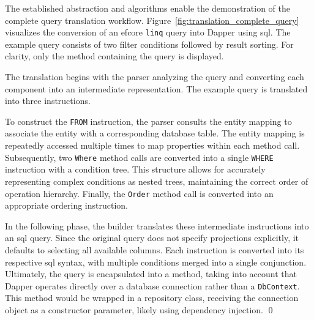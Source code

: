 
\begin{example}
\small
The established abstraction and algorithms enable the demonstration of the complete query translation workflow. Figure~\ref{fig:translation_complete_query} visualizes the conversion of an \acrshort{efcore} \texttt{linq} query into Dapper using \acrshort{sql}. The example query consists of two filter conditions followed by result sorting. For clarity, only the method containing the query is displayed. 

The translation begins with the parser analyzing the query and converting each component into an intermediate representation. The example query is translated into three instructions.

To construct the \texttt{FROM} instruction, the parser consults the entity mapping to associate the entity with a corresponding database table. The entity mapping is repeatedly accessed multiple times to map  properties within each method call. Subsequently, two \texttt{Where} method calls are converted into a single \texttt{WHERE} instruction with a condition tree. This structure allows for accurately representing complex conditions as nested trees, maintaining the correct order of operation hierarchy. Finally, the \texttt{Order} method call is converted into an appropriate ordering instruction.

In the following phase, the builder translates these intermediate instructions into an \acrshort{sql} query. Since the original query does not specify projections explicitly, it defaults to selecting all available columns. Each instruction is converted into its respective \acrshort{sql} syntax, with multiple conditions merged into a single conjunction. Ultimately, the query is encapsulated into a method, taking into account that Dapper operates directly over a database connection rather than a \texttt{DbContext}. This method would be wrapped in a repository class, receiving the connection object as a constructor parameter, likely using dependency injection. 
\qed
\end{example}


